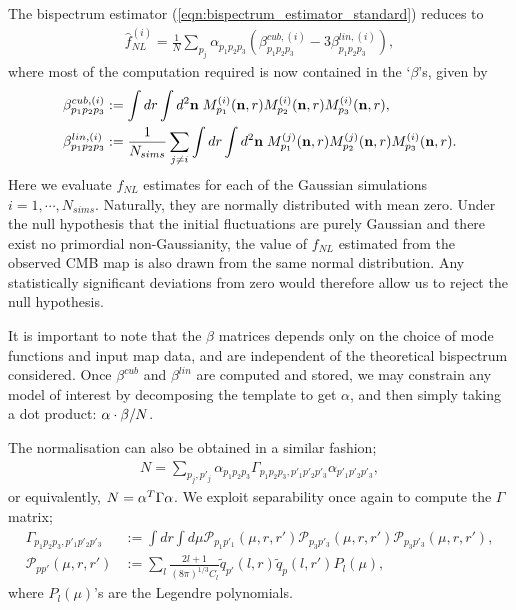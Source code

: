 The bispectrum estimator (\ref{eqn:bispectrum_estimator_standard}) reduces to
\begin{align}
	\hat{f}_{NL}^{(i)} = \frac{1}{N} \sum_{p_j} \alpha_{p_1 p_2 p_3} (\beta^{cub,(i)}_{p_1 p_2 p_3} - 3 \beta^{lin,(i)}_{p_1 p_2 p_3}), \label{eqn:fNL_from_betas}
\end{align}
where most of the computation required is now contained in the `$\beta$'s, given by
\begin{align}
	\beta^{cub,(i)}_{p_1 p_2 p_3} &:= \int dr \int d^2\mathbf{n} \; M^{(i)}_{p_1} (\mathbf{n},r) M^{(i)}_{p_2} (\mathbf{n},r) M^{(i)}_{p_3} (\mathbf{n},r),	\label{def:beta_cubic} \\
	\beta^{lin,(i)}_{p_1 p_2 p_3} &:= \frac{1}{N_{sims}} \sum_{j \neq i} \int dr \int d^2\mathbf{n} \; M^{(j)}_{p_1} (\mathbf{n},r) M^{(j)}_{p_2} (\mathbf{n},r) M^{(i)}_{p_3} (\mathbf{n},r). \label{def:beta_linear}
\end{align}
Here we evaluate $f_{NL}$ estimates for each of the Gaussian simulations $i=1,\cdots,N_{sims}$. Naturally, they are normally distributed with mean zero. Under the null hypothesis that the initial fluctuations are purely Gaussian and there exist no primordial non-Gaussianity, the value of $f_{NL}$ estimated from the observed CMB map is also drawn from the same normal distribution. Any statistically significant deviations from zero would therefore allow us to reject the null hypothesis.

It is important to note that the $\beta$ matrices depends only on the choice of mode functions and input map data, and are independent of the theoretical bispectrum considered. Once $\beta^{cub}$ and $\beta^{lin}$ are computed and stored, we may constrain any model of interest by decomposing the template to get $\alpha$, and then simply taking a dot product: $\mathbf{\alpha} \cdot \mathbf{\beta} / N$.

The normalisation can also be obtained in a similar fashion;
\begin{align}
	N = \sum_{p_j, p'_j} \alpha_{p_1 p_2 p_3} \Gamma_{p_1 p_2 p_3, p'_1 p'_2 p'_3} \alpha_{p'_1 p'_2 p'_3}, \label{eqn:normlisation_from_gamma}
\end{align}
or equivalently, $N = \mathbf{\alpha}^T \Gamma \mathbf{\alpha}$. We exploit separability once again to compute the $\Gamma$ matrix;
\begin{align}
	\Gamma_{p_1 p_2 p_3, p'_1 p'_2 p'_3} &:= \int dr \int d\mu \mathcal{P}_{p_1 p'_1}(\mu, r, r') \mathcal{P}_{p_3 p'_3}(\mu, r, r') \mathcal{P}_{p_3 p'_3}(\mu, r, r'), 	\label{def:gamma} 	\\
	\mathcal{P}_{p p'}(\mu, r, r') &:= \sum_l \frac{2l+1}{(8\pi)^{1/3} C_l} \tilde{q}_{p'}(l,r) \tilde{q}_p(l,r') P_l(\mu),
\end{align}
where $P_l(\mu)$'s are the Legendre polynomials.

